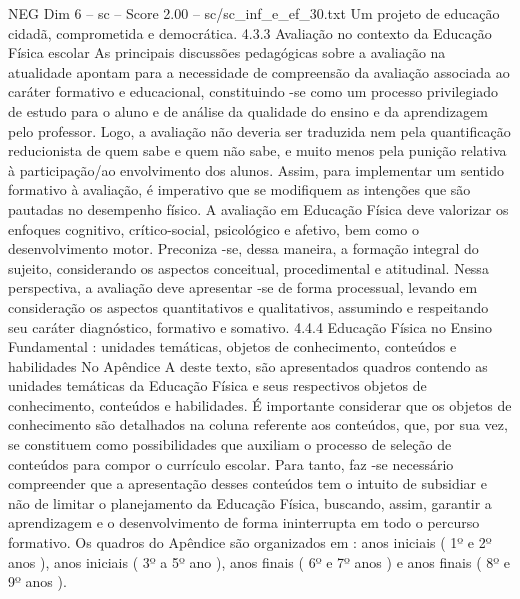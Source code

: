 \begin{textsample}{NEG Dim 6 – sc – Score 2.00 – sc/sc\_inf\_e\_ef\_30.txt}
Um projeto de educação cidadã, comprometida e democrática. 4.3.3 Avaliação no contexto da Educação Física escolar As principais discussões pedagógicas sobre a avaliação na atualidade apontam para a necessidade de compreensão da avaliação associada ao caráter formativo e educacional, constituindo -se como um processo privilegiado de estudo para o aluno e de análise da qualidade do ensino e da aprendizagem pelo professor.
Logo, a avaliação não deveria ser traduzida nem pela quantificação reducionista de quem sabe e quem não sabe, e muito menos pela punição relativa à participação/ao envolvimento dos alunos.
Assim, para implementar um sentido formativo à avaliação, é imperativo que se modifiquem as intenções que são pautadas no desempenho físico.
A avaliação em Educação Física deve valorizar os enfoques cognitivo, crítico-social, psicológico e afetivo, bem como o desenvolvimento motor.
Preconiza -se, dessa maneira, a formação integral do sujeito, considerando os aspectos conceitual, procedimental e atitudinal.
Nessa perspectiva, a avaliação deve apresentar -se de forma processual, levando em consideração os aspectos quantitativos e qualitativos, assumindo e respeitando seu caráter diagnóstico, formativo e somativo. 4.4.4 Educação Física no Ensino Fundamental : unidades temáticas, objetos de conhecimento, conteúdos e habilidades No Apêndice A deste texto, são apresentados quadros contendo as unidades temáticas da Educação Física e seus respectivos objetos de conhecimento, conteúdos e habilidades.
É importante considerar que os objetos de conhecimento são detalhados na coluna referente aos conteúdos, que, por sua vez, se constituem como possibilidades que auxiliam o processo de seleção de conteúdos para compor o currículo escolar.
Para tanto, faz -se necessário compreender que a apresentação desses conteúdos tem o intuito de subsidiar e não de limitar o planejamento da Educação Física, buscando, assim, garantir a aprendizagem e o desenvolvimento de forma ininterrupta em todo o percurso formativo.
Os quadros do Apêndice são organizados em : anos iniciais ( 1º e 2º anos ), anos iniciais ( 3º a 5º ano ), anos finais ( 6º e 7º anos ) e anos finais ( 8º e 9º anos ).

\end{textsample}
